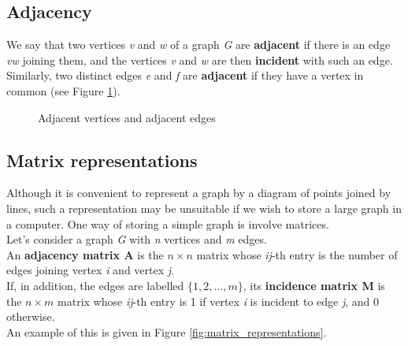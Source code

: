 \subsection{Adjacency}
We say that two vertices \textit{v} and \textit{w} of a graph \textit{G} are \textbf{adjacent} if there is an edge \textit{vw} joining them, and the vertices \textit{v} and \textit{w} are then \textbf{incident} with such an edge. \\
Similarly, two distinct edges \textit{e} and \textit{f} are \textbf{adjacent} if they have a vertex in common (see Figure \ref{fig:adiacency}).

\begin{figure}[H]
    \centering
    \quad %
    \caption{Adjacent vertices and adjacent edges}
    \label{fig:adiacency}
\end{figure}

\subsection{Matrix representations}
Although it is convenient to represent a graph by a diagram of points joined by lines,
such a representation may be unsuitable if we wish to store a large graph in a computer.
One way of storing a simple graph is involve matrices. \\
Let's consider a graph \textit{G} with \textit{n} vertices and \textit{m} edges. \\
An \textbf{adjacency matrix A} is the $n \times n$ matrix whose \textit{ij}-th entry is the number of edges joining vertex \textit{i} and vertex \textit{j}. \\
If, in addition, the edges are labelled $\{1, 2, \dots, m\}$, its \textbf{incidence matrix M} is the $n \times m$ matrix whose \textit{ij}-th entry is 1 if vertex \textit{i} is incident to edge \textit{j}, and 0 otherwise. \\
An example of this is given in Figure \ref{fig:matrix_representations}.

